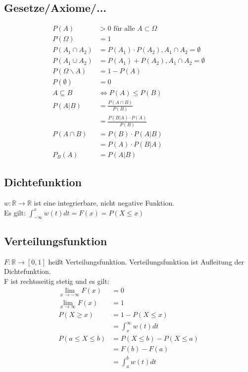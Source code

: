 \documentclass[a4paper, 10pt, landscape]{article}
\newcommand{\limFromTo}[2]{ \lim\limits_{#2 \rightarrow #1}}
\begin{document}
\begin{multicols}{5}
\begin{small}
	    \subsection{Gesetze/Axiome/...}
		    \begin{align*}
		    	P(A) &> 0 \text{ für alle } A \subset \Omega\\
		    	P(\Omega) &= 1\\
		    	P(A_1 \cap A_2) &= P(A_1) \cdot P(A_2), A_1 \cap A_2 = \emptyset \\
		    	P(A_1 \cup A_2) &= P(A_1) + P(A_2), A_1 \cap A_2 = \emptyset \\
		    	P(\Omega \backslash A) &= 1 - P(A)\\
		    	P(\emptyset) &= 0\\
		    	A \subseteq B &\iff P(A) \leq P(B) \\
		    	P(A|B) &= \frac{P(A \cap B)}{P(B)} \\
		    	&= \frac{P(B|A)\cdot P(A)}{P(B)} \\
		    	P(A\cap B) &= P(B) \cdot P(A|B)\\
		    	&= P(A) \cdot P(B|A)\\
		    	P_B(A) &= P(A|B)
	    	\end{align*}
		\subsection{Dichtefunktion}
		    $w: \mathbb{R} \rightarrow \mathbb{R}$ ist eine integrierbare, nicht negative Funktion. \\
	    	Es gilt: $\int_{-\infty}^{x} w(t) dt = F(x) = P(X \leq x)$
	    \subsection{Verteilungsfunktion}
	    	$F: \mathbb{R} \rightarrow \left[0,1\right]$ heißt Verteilungsfunktion. Verteilungsfunktion ist Aufleitung der Dichtefunktion.\\
	    	F ist rechtsseitig stetig und es gilt:
	    	\begin{align*}
	    		\limFromTo{-\infty}{x} F(x) &= 0\\
	    		\limFromTo{\infty}{x} F(x) &= 1\\
	    		P(X \geq x) &= 1 - P(X \leq x) \\
	    		&= \int_{x}^{\infty} w(t)dt\\
	    		P(a \le X \le b) &= P(X \le b) - P(X \le a)\\
	    		&= F(b) - F(a) \\
	    		&= \int_{a}^{b} w(t)dt
	    	\end{align*}

\end{small}
\end{multicols}
\end{document}
